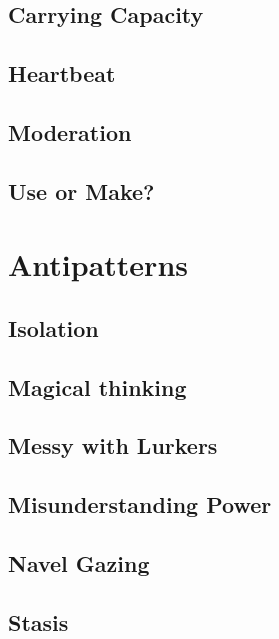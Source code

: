 \documentclass[ebook, 12pt, twoside]{memoir}
\begin{document}
\section*{Carrying Capacity}

\section*{Heartbeat}

\section*{Moderation}

%
\section*{Use or Make?}


\chapter[\textbf{Antipatterns}]{Antipatterns}

\section*{Isolation}

\section*{Magical thinking}

\section*{Messy with Lurkers}

\section*{Misunderstanding Power}

\section*{Navel Gazing}

\section*{Stasis}

\end{document}
